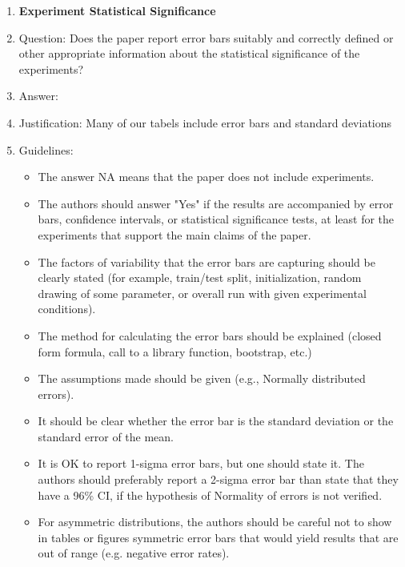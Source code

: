 \documentclass{article} %
\begin{document}
{\begin{appendices}
\begin{enumerate}
\item {\bf Experiment Statistical Significance}
    \item[] Question: Does the paper report error bars suitably and correctly defined or other appropriate information about the statistical significance of the experiments?
    \item[] Answer: \answerYes{} %
    \item[] Justification: Many of our tabels include error bars and standard deviations
    \item[] Guidelines:
    \begin{itemize}
        \item The answer NA means that the paper does not include experiments.
        \item The authors should answer "Yes" if the results are accompanied by error bars, confidence intervals, or statistical significance tests, at least for the experiments that support the main claims of the paper.
        \item The factors of variability that the error bars are capturing should be clearly stated (for example, train/test split, initialization, random drawing of some parameter, or overall run with given experimental conditions).
        \item The method for calculating the error bars should be explained (closed form formula, call to a library function, bootstrap, etc.)
        \item The assumptions made should be given (e.g., Normally distributed errors).
        \item It should be clear whether the error bar is the standard deviation or the standard error of the mean.
        \item It is OK to report 1-sigma error bars, but one should state it. The authors should preferably report a 2-sigma error bar than state that they have a 96\% CI, if the hypothesis of Normality of errors is not verified.
        \item For asymmetric distributions, the authors should be careful not to show in tables or figures symmetric error bars that would yield results that are out of range (e.g. negative error rates).
    \end{itemize}


\end{enumerate}
\end{appendices}}
\end{document}
